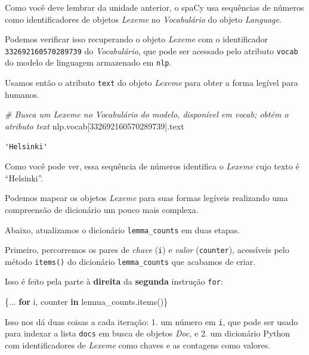 \documentclass[
  brazilian,
]{article}
\newenvironment{Shaded}{}{}
\newcommand{\CommentTok}[1]{\textcolor[rgb]{0.38,0.63,0.69}{\textit{#1}}}
\newcommand{\ControlFlowTok}[1]{\textcolor[rgb]{0.00,0.44,0.13}{\textbf{#1}}}
\newcommand{\DecValTok}[1]{\textcolor[rgb]{0.25,0.63,0.44}{#1}}
\newcommand{\KeywordTok}[1]{\textcolor[rgb]{0.00,0.44,0.13}{\textbf{#1}}}
\newcommand{\NormalTok}[1]{#1}
\begin{document}
Como você deve lembrar da unidade anterior, o spaCy usa sequências de
números como identificadores de objetos \emph{Lexeme} no
\emph{Vocabulário} do objeto \emph{Language}.

Podemos verificar isso recuperando o objeto \emph{Lexeme} com o
identificador \texttt{332692160570289739} do \emph{Vocabulário}, que
pode ser acessado pelo atributo \texttt{vocab} do modelo de linguagem
armazenado em \texttt{nlp}.

Usamos então o atributo \texttt{text} do objeto \emph{Lexeme} para obter
a forma legível para humanos.

\begin{Shaded}
\begin{Highlighting}[]
\CommentTok{\# Busca um Lexeme no Vocabulário do modelo, disponível em \textquotesingle{}vocab\textquotesingle{}; obtém o atributo \textquotesingle{}text\textquotesingle{}}
\NormalTok{nlp.vocab[}\DecValTok{332692160570289739}\NormalTok{].text}
\end{Highlighting}
\end{Shaded}

\begin{verbatim}
'Helsinki'
\end{verbatim}

Como você pode ver, essa sequência de números identifica o \emph{Lexeme}
cujo texto é ``Helsinki''.

Podemos mapear os objetos \emph{Lexeme} para suas formas legíveis
realizando uma compreensão de dicionário um pouco mais complexa.

Abaixo, atualizamos o dicionário \texttt{lemma\_counts} em duas etapas.

Primeiro, percorremos os pares de \emph{chave} (\texttt{i}) e
\emph{valor} (\texttt{counter}), acessíveis pelo método \texttt{items()}
do dicionário \texttt{lemma\_counts} que acabamos de criar.

Isso é feito pela parte à \textbf{direita} da \textbf{segunda} instrução
\texttt{for}:

\begin{Shaded}
\begin{Highlighting}[]
\NormalTok{\{... }\ControlFlowTok{for}\NormalTok{ i, counter }\KeywordTok{in}\NormalTok{ lemma\_counts.items()\}}
\end{Highlighting}
\end{Shaded}

Isso nos dá duas coisas a cada iteração: 1. um número em \texttt{i}, que
pode ser usado para indexar a lista \texttt{docs} em busca de objetos
\emph{Doc}, e 2. um dicionário Python com identificadores de
\emph{Lexeme} como chaves e as contagens como valores.
\end{document}
